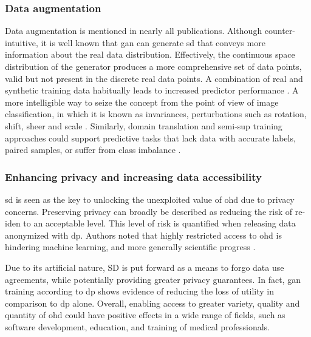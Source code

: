         \subsubsection{Data augmentation}\label{sec:augmentation}
    
            Data augmentation is mentioned in nearly all publications. Although counter-intuitive, it is well known that \gls{gan} can generate \gls{sd} that conveys more information about the real data distribution. Effectively, the continuous space distribution of the generator produces a more comprehensive set of data points, valid but not present in the discrete real data points. A combination of real and synthetic training data habitually leads to increased predictor performance \cite{Wang_2019,Che_2017,Yoon2018-ite, yoon2018imputation}. A more intelligible way to seize the concept from the point of view of image classification, in which it is known as invariances, perturbations such as rotation, shift, sheer and scale \cite{antoniou2017data}. Similarly, domain translation and \gls{semi-sup} training approaches could support predictive tasks that lack data with accurate labels, paired samples, or suffer from class imbalance \cite{Che_2017,mcdermott2018semi}. 

        \subsubsection{Enhancing privacy and increasing data accessibility}\label{sec:access_privacy}
    
            \gls{sd} is seen as the key to unlocking the unexploited value of \gls{ohd} due to privacy concerns. Preserving privacy can broadly be described as reducing the risk of \gls{re-iden} to an acceptable level. This level of risk is quantified when releasing data anonymized with \gls{dp}. Authors noted that highly restricted access to \gls{ohd} is hindering machine learning, and more generally scientific progress \cite{Beaulieu-Jones2019-ct, baowaly_2019_IEEE,baowaly_2019_jamia,Che_2017,esteban2017real,Fisher2019}.\par
    
            Due to its artificial nature, SD is put forward as a means to forgo data use agreements, while potentially providing greater privacy guarantees\cite{Beaulieu-Jones2019-ct, baowaly_2019_IEEE, baowaly_2019_jamia,esteban2017real,Fisher2019,walsh2020generating}. In fact, \gls{gan} training according to \gls{dp} shows evidence of reducing the loss of utility in comparison to \gls{dp} alone.  Overall, enabling access to greater variety, quality and quantity of \gls{ohd} could have positive effects in a wide range of fields, such as software development, education, and training of medical professionals. 
    
